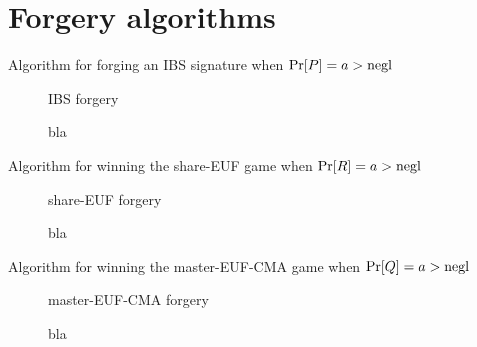 \section{Forgery algorithms}
  Algorithm for forging an IBS signature when $\Pr[P] = a > \text{negl}$
  \begin{figure}[H]
    \begin{algobox}{IBS forgery}
      \begin{algorithmic}[1]
        \State bla
      \end{algorithmic}
    \end{algobox}
    \caption{}
    \label{alg:forge:ibs}
  \end{figure}

  Algorithm for winning the \textsf{share-EUF} game when $\Pr[R] = a > \text{negl}$
  \begin{figure}[H]
    \begin{algobox}{\textsf{share-EUF} forgery}
      \begin{algorithmic}[1]
        \State bla
      \end{algorithmic}
    \end{algobox}
    \caption{}
    \label{alg:forge:share}
  \end{figure}

  Algorithm for winning the \textsf{master-EUF-CMA} game when $\Pr[Q] = a >
  \text{negl}$
  \begin{figure}[H]
    \begin{algobox}{\textsf{master-EUF-CMA} forgery}
      \begin{algorithmic}[1]
        \State bla
      \end{algorithmic}
    \end{algobox}
    \caption{}
    \label{alg:forge:master}
  \end{figure}
